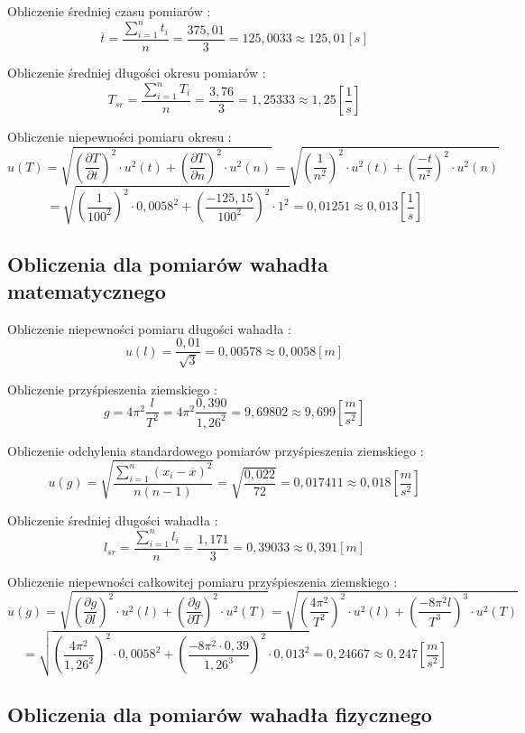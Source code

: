 \documentclass[12pt]{article}
\begin{document}
Obliczenie średniej czasu pomiarów : 
$$ \overline{t} = \frac{\sum\limits_{i=1}^{n} t_i}{n} = \frac{375,01}{3} = 125,0033 \approx 125,01[s] $$

Obliczenie średniej długości okresu pomiarów :
$$ T_{sr} = \frac{\sum\limits_{i = 1}^{n} T_i}{n} = \frac{3,76}{3} = 1,25333 \approx 1,25\left[ \frac{1}{s} \right] $$

Obliczenie niepewności pomiaru okresu : 
$$ u(T) = \sqrt{ \left( \frac{\partial T}{\partial t} \right)^2 \cdot u^2(t) + \left( \frac{\partial T}{\partial n} \right)^2 \cdot u^2(n) }
= \sqrt{ \left( \frac{1}{n^2} \right)^2 \cdot u^2(t) + \left( \frac{-t}{n^2} \right)^2 \cdot u^2(n) } $$
$$ = \sqrt{ \left( \frac{1}{100^2} \right)^2 \cdot 0,0058^2 + \left( \frac{-125,15}{100^2} \right)^2 \cdot 1^2 } = 0,01251 \approx 0,013 \left[ \frac{1}{s} \right]$$

\subsection{Obliczenia dla pomiarów wahadła matematycznego}

Obliczenie niepewności pomiaru długości wahadła :
$$ u(l) = \frac{0,01}{\sqrt{3}} = 0,00578 \approx 0,0058[m] $$

Obliczenie przyśpieszenia ziemskiego : 
$$ g = 4\pi^2 \frac{l}{T^2} = 4\pi^2 \frac{0,390}{1,26^2} = 9,69802 \approx 9,699 \left[ \frac{m}{s^2} \right] $$

Obliczenie odchylenia standardowego pomiarów przyśpieszenia ziemskiego :
$$ u(g) = \sqrt{ \frac{\sum\limits_{i=1}^n (x_i - \overline{x})^2}{n(n-1)} } = \sqrt{ \frac{0,022}{72} } = 0,017411 \approx 0,018 \left[\frac{m}{s^2} \right] $$ 

Obliczenie średniej długości wahadła :
$$ l_{sr} = \frac{\sum\limits_{i=1}^{n} l_i}{n} = \frac{1,171}{3} = 0,39033 \approx 0,391[m]$$

Obliczenie niepewności całkowitej pomiaru przyśpieszenia ziemskiego :
$$ u(g) = \sqrt{ \left( \frac{\partial g}{\partial l} \right)^2 \cdot u^2(l) + \left( \frac{\partial g}{\partial T} \right)^2 \cdot u^2(T) }
= \sqrt{ \left( \frac{4 \pi^2}{T^2} \right)^2 \cdot u^2(l) + \left( \frac{-8 \pi^2 l}{T^3} \right)^3 \cdot u^2(T) } $$
$$ = \sqrt{ \left( \frac{4\pi^2}{1,26^2} \right)^2 \cdot 0,0058^2 + \left( \frac{-8\pi^2 \cdot 0,39}{1,26^3} \right)^2 \cdot 0,013^2 }
= 0,24667 \approx 0,247 \left[ \frac{m}{s^2} \right] $$


\subsection{Obliczenia dla pomiarów wahadła fizycznego}
\end{document}
